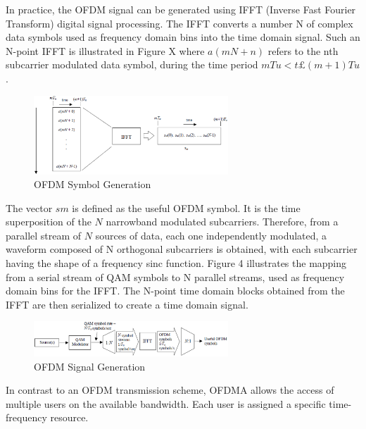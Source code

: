In practice, the OFDM signal can be generated using IFFT (Inverse Fast Fourier Transform)
digital signal processing. The IFFT converts a number N of complex data
symbols used as frequency domain bins into the time domain signal. Such an N-point
IFFT is illustrated in Figure X where $a(mN+n)$ refers to the nth subcarrier
modulated data symbol, during the time period $mTu < t £ (m+1)Tu$.

\begin{figure}[htbp]
    \centering
    \includegraphics[width=0.65\textwidth]{./figures/ofdm_symbol_gen}
    \caption{ OFDM Symbol Generation
    \label{fig:ofdmsymbol}}
\end{figure}

The vector $sm$ is defined as the useful OFDM symbol. It is the time superposition
of the $N$ narrowband modulated subcarriers. Therefore, from a parallel stream
of $N$ sources of data, each one independently modulated, a waveform composed of
N orthogonal subcarriers is obtained, with each subcarrier having the shape of a
frequency sinc function. Figure 4 illustrates the mapping from a
serial stream of QAM symbols to N parallel streams, used as frequency domain bins
for the IFFT. The N-point time domain blocks obtained from the IFFT are then
serialized to create a time domain signal.

\begin{figure}[htbp]
    \centering
    \includegraphics[width=0.65\textwidth]{./figures/ofdm_signal_chain}
    \caption{ OFDM Signal Generation
    \label{fig:ofdmchain}}
\end{figure}

In contrast to an OFDM transmission scheme, OFDMA allows the access of multiple
users on the available bandwidth. Each user is assigned a specific time-frequency
resource.

